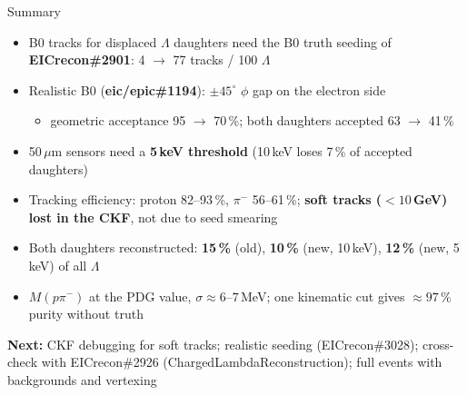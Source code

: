 \documentclass[aspectratio=169,10pt]{beamer}
\begin{document}
\begin{frame}{Summary}
\begin{itemize}
\item B0 tracks for displaced $\Lambda$ daughters need the B0 truth seeding of \textbf{EICrecon\#2901}: 4 $\to$ 77 tracks / 100 $\Lambda$
\item Realistic B0 (\textbf{eic/epic\#1194}): $\pm 45^\circ$ $\phi$ gap on the electron side
\begin{itemize}
\item geometric acceptance 95 $\to$ 70\,\%; both daughters accepted 63 $\to$ 41\,\%
\end{itemize}
\item 50\,$\mu$m sensors need a \textbf{5\,keV threshold} (10\,keV loses 7\,\% of accepted daughters)
\item Tracking efficiency: proton 82--93\,\%, $\pi^-$ 56--61\,\%; \textbf{soft tracks ($<10$\,GeV) lost in the CKF}, not due to seed smearing
\item Both daughters reconstructed: \textbf{15\,\%} (old), \textbf{10\,\%} (new, 10\,keV), \textbf{12\,\%} (new, 5\,keV) of all $\Lambda$
\item $M(p\pi^-)$ at the PDG value, $\sigma \approx 6$--$7$\,MeV; one kinematic cut gives $\approx 97\,\%$ purity without truth
\end{itemize}
\vspace{2mm}
\textbf{Next:} CKF debugging for soft tracks; realistic seeding (EICrecon\#3028); cross-check with
EICrecon\#2926 (ChargedLambdaReconstruction); full events with backgrounds and vertexing
\end{frame}
\end{document}
